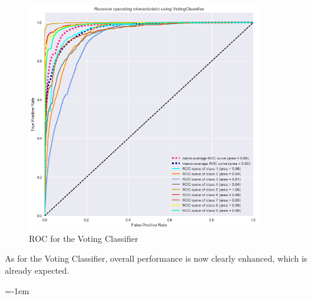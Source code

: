 \documentclass[a4paper,english,12pt]{article}
\makeatletter
\newcommand{\emptypage}[1]{
  \cleardoublepage
  \begingroup
  \let\ps@plain\ps@empty
  \pagestyle{empty}
  #1
  \cleardoublepage
  \endgroup}
\makeatother
\begin{document}
\begin{figure}[H]
	\centering
	\includegraphics[width=0.9\textwidth,keepaspectratio]{ROC_OvR_Voting}
	\caption{ROC for the Voting Classifier}
\end{figure}

As for the Voting Classifier, overall performance is now clearly enhanced, which is already expected. 



\parskip=-1em
\let\section\oldsection %
%
\end{document}
